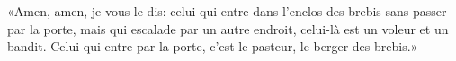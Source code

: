 \encetemps \jesuspharisiens
	«Amen, amen, je vous le dis:
	celui qui entre dans l’enclos des brebis sans passer par la porte,
		mais qui escalade par un autre endroit,
	celui-là est un voleur et un bandit.
Celui qui entre par la porte, c’est le pasteur, le berger des brebis.»
